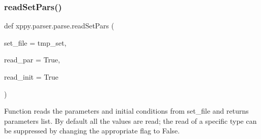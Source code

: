 \subsubsection{\texorpdfstring{read\+Set\+Pars()}{readSetPars()}}
{\footnotesize\ttfamily def xppy.\+parser.\+parse.\+read\+Set\+Pars (\begin{DoxyParamCaption}\item[{}]{set\+\_\+file = {\ttfamily tmp\+\_\+set},  }\item[{}]{read\+\_\+par = {\ttfamily True},  }\item[{}]{read\+\_\+init = {\ttfamily True} }\end{DoxyParamCaption})}

\begin{DoxyVerb}Function reads the parameters and initial conditions
from set_file and returns parameters list. By default all the values 
are read; the read of a specific type can be suppressed by changing
the appropriate flag to False.
\end{DoxyVerb}
 